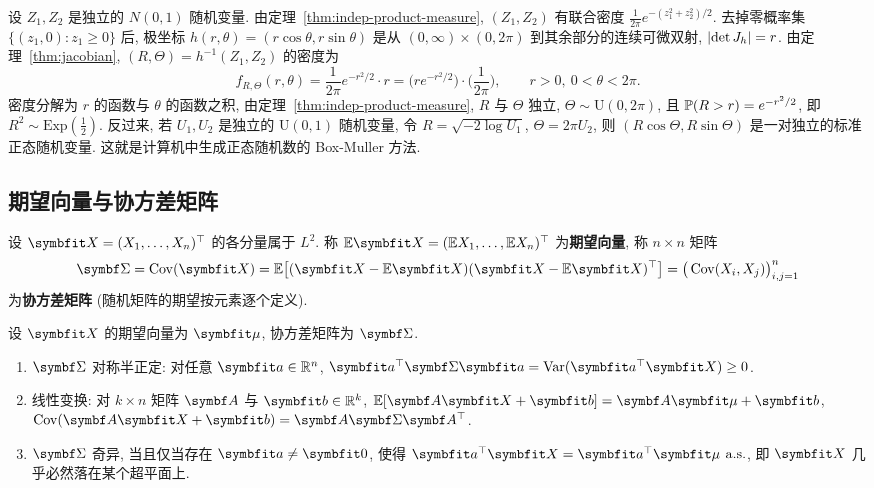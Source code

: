 \begin{example}\label{ex:box-muller}
设 $Z_1,Z_2$ 是独立的 $N(0,1)$ 随机变量. 由定理~\ref{thm:indep-product-measure}, $(Z_1,Z_2)$ 有联合密度 $\frac{1}{2\pi}e^{-(z_1^2+z_2^2)/2}$. 去掉零概率集 $\{(z_1,0): z_1\ge0\}$ 后, 极坐标 $h(r,\theta)=(r\cos\theta,r\sin\theta)$ 是从 $(0,\infty)\times(0,2\pi)$ 到其余部分的连续可微双射, $\abs{\det J_h}=r$. 由定理~\ref{thm:jacobian}, $(R,\Theta)=h^{-1}(Z_1,Z_2)$ 的密度为
\[
f_{R,\Theta}(r,\theta)=\frac{1}{2\pi}e^{-r^2/2}\cdot r=\Big(re^{-r^2/2}\Big)\cdot\Big(\frac{1}{2\pi}\Big),\qquad r>0,\ 0<\theta<2\pi.
\]
密度分解为 $r$ 的函数与 $\theta$ 的函数之积, 由定理~\ref{thm:indep-product-measure}, $R$ 与 $\Theta$ 独立, $\Theta\sim\mathrm{U}(0,2\pi)$, 且 $\P(R>r)=e^{-r^2/2}$, 即 $R^2\sim\mathrm{Exp}(\frac{1}{2})$. 反过来, 若 $U_1,U_2$ 是独立的 $\mathrm{U}(0,1)$ 随机变量, 令 $R=\sqrt{-2\log U_1}$, $\Theta=2\pi U_2$, 则 $(R\cos\Theta,R\sin\Theta)$ 是一对独立的标准正态随机变量. 这就是计算机中生成正态随机数的 Box-Muller 方法.
\end{example}

\subsection{期望向量与协方差矩阵}

\begin{definition}[期望向量与协方差矩阵]\label{def:covariance-matrix}
设 $\rvec{X}=(X_1,\dots,X_n)^\T$ 的各分量属于 $L^2$. 称 $\E\rvec{X}=(\E X_1,\dots,\E X_n)^\T$ 为\textbf{期望向量}, 称 $n\times n$ 矩阵
\[
\mat{\Sigma}=\Cov(\rvec{X})=\E\big[(\rvec{X}-\E\rvec{X})(\rvec{X}-\E\rvec{X})^\T\big]=\big(\Cov(X_i,X_j)\big)_{i,j=1}^n
\]
为\textbf{协方差矩阵} (随机矩阵的期望按元素逐个定义).
\end{definition}

\begin{proposition}[协方差矩阵的性质]\label{prop:covariance-matrix}
设 $\rvec{X}$ 的期望向量为 $\rvec{\mu}$, 协方差矩阵为 $\mat{\Sigma}$.
\begin{enumerate}
\item $\mat{\Sigma}$ 对称半正定: 对任意 $\rvec{a}\in\R^n$, $\rvec{a}^\T\mat{\Sigma}\rvec{a}=\Var(\rvec{a}^\T\rvec{X})\ge0$.
\item 线性变换: 对 $k\times n$ 矩阵 $\mat{A}$ 与 $\rvec{b}\in\R^k$, $\E[\mat{A}\rvec{X}+\rvec{b}]=\mat{A}\rvec{\mu}+\rvec{b}$, $\Cov(\mat{A}\rvec{X}+\rvec{b})=\mat{A}\mat{\Sigma}\mat{A}^\T$.
\item $\mat{\Sigma}$ 奇异, 当且仅当存在 $\rvec{a}\ne\rvec{0}$, 使得 $\rvec{a}^\T\rvec{X}=\rvec{a}^\T\rvec{\mu}$ $\as$, 即 $\rvec{X}$ 几乎必然落在某个超平面上.
\end{enumerate}
\end{proposition}

